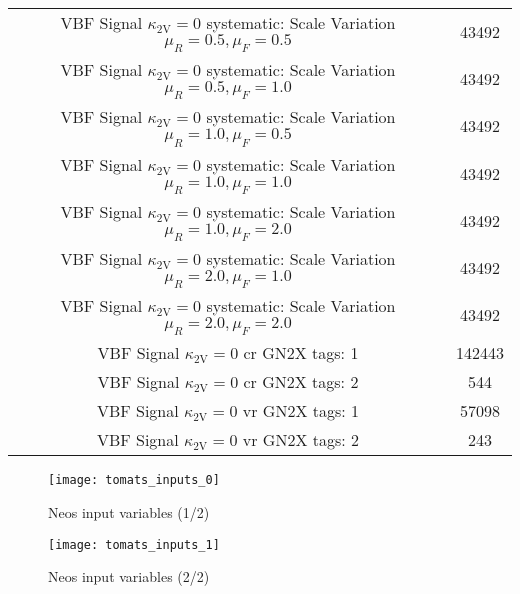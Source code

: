 \begin{table}[]
\begin{tabular}{cc}
        VBF Signal $\kappa_\mathrm{2V}=0$ systematic: Scale Variation $\mu_R = 0.5, \mu_F=0.5$         & 43492  \\
        VBF Signal $\kappa_\mathrm{2V}=0$ systematic: Scale Variation $\mu_R = 0.5, \mu_F=1.0$         & 43492  \\
        VBF Signal $\kappa_\mathrm{2V}=0$ systematic: Scale Variation $\mu_R = 1.0, \mu_F=0.5$         & 43492  \\
        VBF Signal $\kappa_\mathrm{2V}=0$ systematic: Scale Variation $\mu_R = 1.0, \mu_F=1.0$         & 43492  \\
        VBF Signal $\kappa_\mathrm{2V}=0$ systematic: Scale Variation $\mu_R = 1.0, \mu_F=2.0$         & 43492  \\
        VBF Signal $\kappa_\mathrm{2V}=0$ systematic: Scale Variation $\mu_R = 2.0, \mu_F=1.0$         & 43492  \\
        VBF Signal $\kappa_\mathrm{2V}=0$ systematic:         Scale Variation $\mu_R = 2.0, \mu_F=2.0$ & 43492  \\ \hline
        VBF Signal $\kappa_\mathrm{2V}=0$ \ac{cr} GN2X tags: 1                                         & 142443 \\
        VBF Signal $\kappa_\mathrm{2V}=0$ \ac{cr} GN2X tags: 2                                         & 544    \\
        VBF Signal $\kappa_\mathrm{2V}=0$ \ac{vr} GN2X tags: 1                                         & 57098  \\
        VBF Signal $\kappa_\mathrm{2V}=0$ \ac{vr} GN2X tags: 2                                         & 243    \\
    \end{tabular}
    \label{tab:neos-samples}
\end{table}


\begin{figure}
    \centering
    \texttt{[image: tomats\_inputs\_0]}
        \caption[]{Neos input variables (1/2)}
    \label{fig:tomats_inputs_0}    
\end{figure}



\begin{figure}
    \centering
    \texttt{[image: tomats\_inputs\_1]}
        \caption[]{Neos input variables (2/2)}
    \label{fig:tomats_inputs_1}    
\end{figure}





